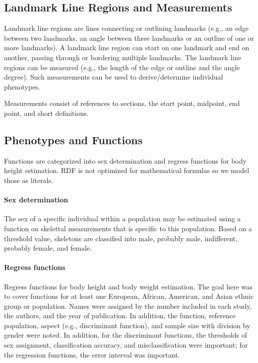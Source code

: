 \documentclass[sw]{iosart2x}
\begin{document}
\subsection{Landmark Line Regions and Measurements}
Landmark line regions are lines connecting or outlining landmarks (e.g., an edge between two landmarks, an angle between three landmarks 
or an outline of one or more landmarks). A landmark line region can start on one landmark and end on another, 
passing through or bordering multiple landmarks.
The landmark line regions can be measured (e.g., the length of the edge or outline and the angle degree).
Such measurements can be used to derive/determine individual phenotypes.

Measurements consist of references to sections, the start point, midpoint, end point, and short definitions.

\subsection{Phenotypes and Functions}
Functions are categorized into sex determination and regress functions for body height estimation.
RDF is not optimized for mathematical formulas so we model those as literals.

\paragraph{Sex determination}
The sex of a specific individual within a population may be estimated using a function on skelettal measurements that is specific to this population.
Based on a threshold value, skeletons are classified into male, probably male, indifferent, probably female, and female.

\paragraph{Regress functions}
Regress functions for body height and body weight estimation.
The goal here was to cover functions for at least one European, African, American, and Asian ethnic group or population.
Names were assigned by the number included in each study, the authors, and the year of publication.
In addition, the function, reference population, aspect (e.g., discriminant function), and sample size with division by gender were noted.
In addition, for the discriminant functions, the thresholds of sex assignment, classification accuracy, and misclassification were important; for the regression functions, the error interval was important.
\end{document}
